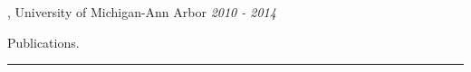\documentclass[]{article}
\begin{document}

, University of Michigan-Ann Arbor \hfill \textit{2010 - 2014}


\iffalse
\vspace{15pt}
{\LARGE Publications.}
\vspace{3pt}
\hrule
\vspace{10pt}
\end{document}
